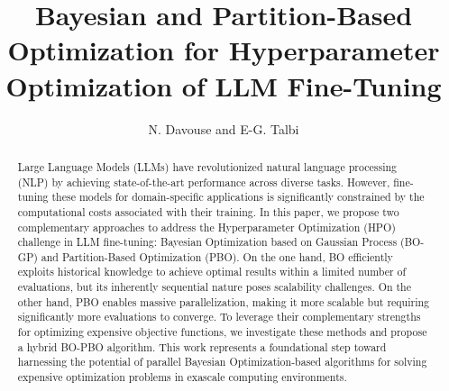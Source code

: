 \documentclass[runningheads]{ola}
\begin{document}
\pagestyle{headings}

\mainmatter

\title{Bayesian and Partition-Based Optimization for Hyperparameter Optimization of LLM Fine-Tuning}


\author{N. Davouse and E-G. Talbi}



\maketitle

\begin{abstract}

Large Language Models (LLMs) have revolutionized natural language processing (NLP) by achieving state-of-the-art performance across diverse tasks. However, fine-tuning these models for domain-specific applications is significantly constrained by the computational costs associated with their training. In this paper, we propose two complementary approaches to address the Hyperparameter Optimization (HPO) challenge in LLM fine-tuning: Bayesian Optimization based on Gaussian Process (BO-GP) and Partition-Based Optimization (PBO). On the one hand, BO efficiently exploits historical knowledge to achieve optimal results within a limited number of evaluations, but its inherently sequential nature poses scalability challenges. On the other hand, PBO enables massive parallelization, making it more scalable but requiring significantly more evaluations to converge. To leverage their complementary strengths for optimizing expensive objective functions, we investigate these methods and propose a hybrid BO-PBO algorithm. This work represents a foundational step toward harnessing the potential of parallel Bayesian Optimization-based algorithms for solving expensive optimization problems in exascale computing environments.

\end{abstract}






  









\end{document}
